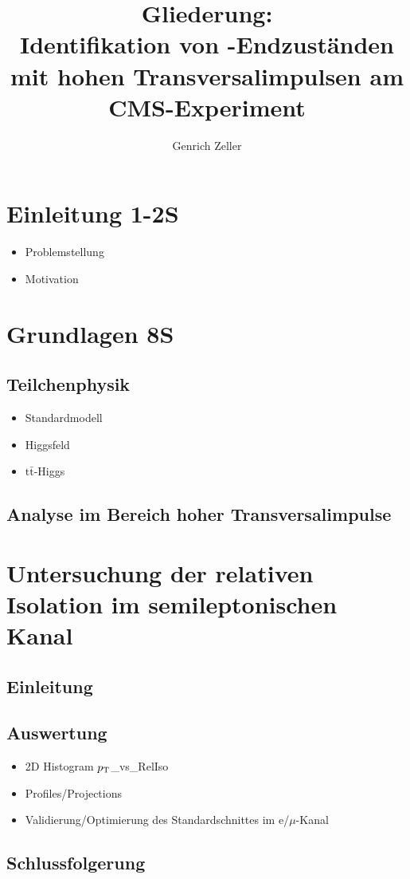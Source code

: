 \documentclass[12pt,a4paper]{article}
\title{Gliederung:\\\textbf{Identifikation von \tth -Endzuständen mit hohen Transversalimpulsen am CMS-Experiment}}
\author{Genrich Zeller}
\newcommand{\ttbar}{$\text{t} \bar{ \text{t}}$}
\newcommand{\pt}{$p_{\text T}$}
\begin{document}
\maketitle
\tableofcontents
\newpage
\section{Einleitung \hspace*{11cm} 1-2S}
\begin{itemize}
\item Problemstellung
\item Motivation
\end{itemize}
\section{Grundlagen \hspace*{11cm} 8S}
\subsection{Teilchenphysik}
\begin{itemize}
\item Standardmodell
\item Higgsfeld
\item \ttbar -Higgs
\end{itemize}
\subsection{Analyse im Bereich hoher Transversalimpulse}
\section{Untersuchung der relativen Isolation im semileptonischen Kanal}
\subsection{Einleitung}
\subsection{Auswertung}
\begin{itemize}
\item 2D Histogram \pt \_vs\_RelIso
\item Profiles/Projections
\item Validierung/Optimierung des Standardschnittes im e/$\mu$-Kanal
\end{itemize}
\subsection{Schlussfolgerung}
\end{document}
